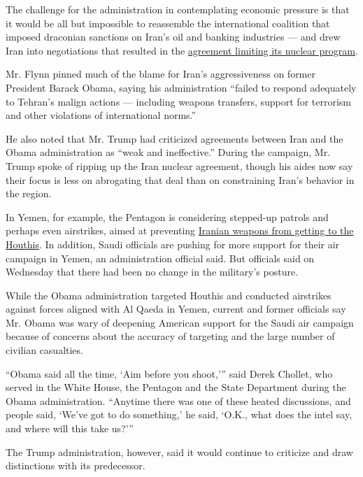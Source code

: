 The challenge for the administration in contemplating economic pressure
is that it would be all but impossible to reassemble the international
coalition that imposed draconian sanctions on Iran's oil and banking
industries --- and drew Iran into negotiations that resulted in the
\href{https://www.nytimes3xbfgragh.onion/2015/07/15/world/middleeast/iran-nuclear-deal-is-reached-after-long-negotiations.html}{agreement
limiting its nuclear program}.

Mr. Flynn pinned much of the blame for Iran's aggressiveness on former
President Barack Obama, saying his administration ``failed to respond
adequately to Tehran's malign actions --- including weapons transfers,
support for terrorism and other violations of international norms.''

He also noted that Mr. Trump had criticized agreements between Iran and
the Obama administration as ``weak and ineffective.'' During the
campaign, Mr. Trump spoke of ripping up the Iran nuclear agreement,
though his aides now say their focus is less on abrogating that deal
than on constraining Iran's behavior in the region.

In Yemen, for example, the Pentagon is considering stepped-up patrols
and perhaps even airstrikes, aimed at preventing
\href{https://www.nytimes3xbfgragh.onion/2017/01/10/world/middleeast/yemen-iran-weapons-houthis.html}{Iranian
weapons from getting to the Houthis}. In addition, Saudi officials are
pushing for more support for their air campaign in Yemen, an
administration official said. But officials said on Wednesday that there
had been no change in the military's posture.

While the Obama administration targeted Houthis and conducted airstrikes
against forces aligned with Al Qaeda in Yemen, current and former
officials say Mr. Obama was wary of deepening American support for the
Saudi air campaign because of concerns about the accuracy of targeting
and the large number of civilian casualties.

``Obama said all the time, `Aim before you shoot,''' said Derek Chollet,
who served in the White House, the Pentagon and the State Department
during the Obama administration. ``Anytime there was one of these heated
discussions, and people said, `We've got to do something,' he said,
`O.K., what does the intel say, and where will this take us?'''

The Trump administration, however, said it would continue to criticize
and draw distinctions with its predecessor.

